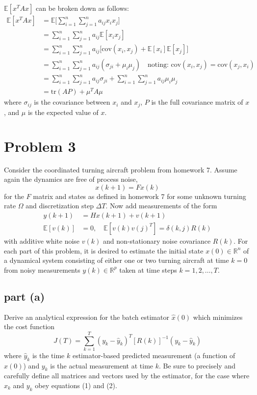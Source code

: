 \documentclass[11pt]{article}
\begin{document}
\subparagraph*{}
$\mathbb{E}[x^TAx]$ can be broken down as follows:
\begin{align*}
	\mathbb{E}[x^TAx] &= \mathbb{E}\Bigg[\sum_{i=1}^n\sum_{j=1}^n a_{ij}x_ix_j\Bigg] \\
	&= \sum_{i=1}^n\sum_{j=1}^na_{ij}\mathbb{E}[x_ix_j]\\
	&= \sum_{i=1}^n\sum_{j=1}^na_{ij}\Bigg[\text{cov}(x_i,x_j)+\mathbb{E}[x_i]\mathbb{E}[x_j]\Bigg] \\
	&= \sum_{i=1}^n\sum_{j=1}^n a_{ij}(\sigma_{ji}+\mu_i\mu_j)\quad \text{noting: } \text{cov}(x_i,x_j)=\text{cov}(x_j,x_i)\\
	&= \sum_{i=1}^n\sum_{j=1}^n a_{ij}\sigma_{ji} + \sum_{i=1}^n\sum_{j=1}^n a_{ij}\mu_i\mu_j \\
	&= \text{tr}(AP) + \mu^TA\mu
\end{align*}
where $\sigma_{ij}$ is the covariance between $x_i$ and $x_j$, $P$ is the full covariance matrix of $x$, and $\mu$ is the expected value of $x$.

\section*{Problem 3}
Consider the coordinated turning aircraft problem from homework 7. Assume again the dynamics are free of process noise,
\begin{equation*}
	x(k+1)=Fx(k)
\end{equation*}
for the $F$ matrix and states as defined in homework 7 for some unknown turning rate $\Omega$ and discretization step $\Delta T$. Now add measurements of the form 
\begin{align*}
	y(k+1)&=Hx(k+1)+v(k+1) \\
	\mathbb{E}[v(k)] &= 0,\quad \mathbb{E}[v(k)v(j)^T] = \delta(k,j)R(k)
\end{align*}
with additive white noise $v(k)$ and non-stationary noise covariance $R(k)$. For each part of this problem, it is desired to estimate the initial state $x(0)\in\mathbb{R}^n$ of a dynamical system consisting of either one or two turning aircraft at time $k=0$ from noisy measurements $y(k)\in\mathbb{R}^p$ taken at time steps $k=1,2,\dots,T$.

\subsection*{part (a)}
Derive an analytical expression for the batch estimator $\hat{x}(0)$ which minimizes the cost function
\begin{equation*}
	J(T)=\sum_{k=1}^T(y_k-\hat{y}_k)^T[R(k)]^{-1}(y_k-\hat{y}_k)
\end{equation*}
where $\hat{y}_k$ is the time $k$ estimator-based predicted measurement (a function of $\hat{x}(0)$) and $y_k$ is the actual measurement at time $k$. Be sure to precisely and carefully define all matrices and vectors used by the estimator, for the case where $x_k$ and $y_k$ obey equations (1) and (2).
\end{document}
